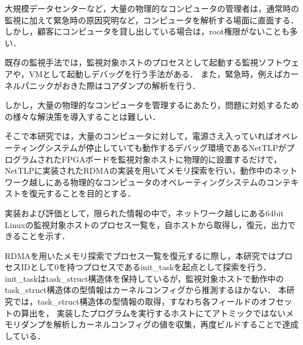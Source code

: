 \begin{jabstract}

大規模データセンターなど，大量の物理的なコンピュータの管理者は，通常時の監視に加えて緊急時の原因究明など，コンピュータを解析する場面に直面する．
しかし，顧客にコンピュータを貸し出している場合は，root権限がないことも多い．

既存の監視手法では，監視対象ホストのプロセスとして起動する監視ソフトウェアや，VMとして起動しデバッグを行う手法がある．
また，緊急時，例えばカーネルパニックがおきた際はコアダンプの解析を行う．

しかし，大量の物理的なコンピュータを管理するにあたり，問題に対処するための様々な解決策を導入することは難しい．

そこで本研究では，大量のコンピュータに対して，電源さえ入っていればオペレーティングシステムが停止していても動作するデバッグ環境であるNetTLPがプログラムされたFPGAボードを監視対象ホストに物理的に設置するだけで，
NetTLPに実装されたRDMAの実装を用いてメモリ探索を行い，動作中のネットワーク越しにある物理的なコンピュータのオペレーティングシステムのコンテキストを復元することを目的とする．

実装および評価として，限られた情報の中で，ネットワーク越しにある64bit Linuxの監視対象ホストのプロセス一覧を，自ホストから取得し，復元，出力できることを示す．

RDMAを用いたメモリ探索でプロセス一覧を復元するに際し，本研究ではプロセスIDとして0を持つプロセスであるinit\_taskを起点として探索を行う．
init\_taskはtask\_struct構造体を保持しているが，監視対象ホストで動作中のtask\_struct構造体の型情報はカーネルコンフィグから推測するほかない．
本研究では，task\_struct構造体の型情報の取得，すなわち各フィールドのオフセットの算出を，
実装したプログラムを実行するホストにてアトミックではないメモリダンプを解析しカーネルコンフィグの値を収集，再度ビルドすることで達成している．

\end{jabstract}

